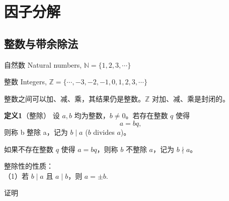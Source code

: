 \section{因子分解}
\subsection{整数与带余除法}

自然数 Natural numbers, 
$ \mathbb{N} = \{ 1, 2, 3, \cdots \} $

整数 Integers, 
$ \mathbb{Z} = \{ \cdots, -3, -2, -1, 0, 1, 2, 3, \cdots \} $

整数之间可以加、减、乘，其结果仍是整数。$ \mathbb{Z} $ 对加、减、乘是封闭的。

\textbf{定义1}（整除） 设 $a, b$ 均为整数，$ b \neq 0 $。若存在整数 $ q $ 使得
\[ 
    a = bq,
\]
则称 b 整除 a，记为 $ b \mid a $ ($b$ divides $a$)。

如果不存在整数 $q$ 使得 $a=bq$，则称 $b$ 不整除 $a$，记为 $b \nmid a$。

整除性的性质：\\
（1）若 $ b \mid a $ 且 $ a \mid b$，则 $a = \pm b$.

证明 